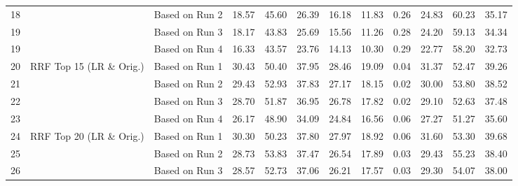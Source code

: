\begin{table*}
{\begin{tabular}{c|c|c|ccc|cc|c|ccc}
18 &  & Based on Run 2 & 18.57 & 45.60 & 26.39 & 16.18 & 11.83 & 0.26 & 24.83 & 60.23 & 35.17\tabularnewline
19 &  & Based on Run 3 & 18.17 & 43.83 & 25.69 & 15.56 & 11.26 & 0.28 & 24.20 & 59.13 & 34.34\tabularnewline
19 &  & Based on Run 4 & 16.33 & 43.57 & 23.76 & 14.13 & 10.30 & 0.29 & 22.77 & 58.20 & 32.73\tabularnewline
\midrule 
\midrule 
20 & \multirow{4}{*}{RRF Top 15 (LR \& Orig.)} & Based on Run 1 & 30.43 & 50.40 & 37.95 & 28.46 & 19.09 & 0.04 & 31.37 & 52.47 & 39.26\tabularnewline
21 &  & Based on Run 2 & 29.43 & 52.93 & 37.83 & 27.17 & 18.15 & 0.02 & 30.00 & 53.80 & 38.52\tabularnewline
22 &  & Based on Run 3 & 28.70 & 51.87 & 36.95 & 26.78 & 17.82 & 0.02 & 29.10 & 52.63 & 37.48\tabularnewline
23 &  & Based on Run 4 & 26.17 & 48.90 & 34.09 & 24.84 & 16.56 & 0.06 & 27.27 & 51.27 & 35.60\tabularnewline
\midrule 
24 & \multirow{4}{*}{RRF Top 20 (LR \& Orig.)} & Based on Run 1 & 30.30 & 50.23 & 37.80 & 27.97 & 18.92 & 0.06 & 31.60 & 53.30 & 39.68\tabularnewline
25 &  & Based on Run 2 & 28.73 & 53.83 & 37.47 & 26.54 & 17.89 & 0.03 & 29.43 & 55.23 & 38.40\tabularnewline
26 &  & Based on Run 3 & 28.57 & 52.73 & 37.06 & 26.21 & 17.57 & 0.03 & 29.30 & 54.07 & 38.00\tabularnewline

\end{tabular}}
\end{table*}
